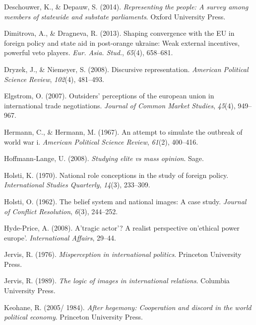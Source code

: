 \documentclass[
  letterpaper,
  DIV=11,
  numbers=noendperiod]{scrartcl}
\newlength{\cslhangindent}
\newenvironment{CSLReferences}[2] %
 {\begin{list}{}{%
  \setlength{\itemindent}{0pt}
  \setlength{\leftmargin}{0pt}
  \setlength{\parsep}{0pt}
  \ifodd #1
   \setlength{\leftmargin}{\cslhangindent}
   \setlength{\itemindent}{-1\cslhangindent}
  \fi
  \setlength{\itemsep}{#2\baselineskip}}}
 {\end{list}}
\begin{document}
\begin{CSLReferences}{1}{0}
Deschouwer, K., \& Depauw, S. (2014). \emph{Representing the people: A
survey among members of statewide and substate parliaments}. Oxford
University Press.

Dimitrova, A., \& Dragneva, R. (2013). Shaping convergence with the {EU}
in foreign policy and state aid in post-orange ukraine: Weak external
incentives, powerful veto players. \emph{Eur. Asia. Stud.},
\emph{65}(4), 658--681.

Dryzek, J., \& Niemeyer, S. (2008). Discursive representation.
\emph{American Political Science Review}, \emph{102}(4), 481--493.

Elgstrom, O. (2007). Outsiders' perceptions of the european union in
international trade negotiations. \emph{Journal of Common Market
Studies}, \emph{45}(4), 949--967.

Hermann, C., \& Hermann, M. (1967). An attempt to simulate the outbreak
of world war i. \emph{American Political Science Review}, \emph{61}(2),
400--416.

Hoffmann-Lange, U. (2008). \emph{Studying elite vs mass opinion}. Sage.

Holsti, K. (1970). National role conceptions in the study of foreign
policy. \emph{International Studies Quarterly}, \emph{14}(3), 233--309.

Holsti, O. (1962). The belief system and national images: A case study.
\emph{Journal of Conflict Resolution}, \emph{6}(3), 244--252.

Hyde-Price, A. (2008). A'tragic actor'? A realist perspective on'ethical
power europe'. \emph{International Affairs}, 29--44.

Jervis, R. (1976). \emph{Misperception in international politics}.
Princeton University Press.

Jervis, R. (1989). \emph{The logic of images in international
relations}. Columbia University Press.

Keohane, R. (2005/ 1984). \emph{After hegemony: Cooperation and discord
in the world political economy}. Princeton University Press.


\end{CSLReferences}
\end{document}
